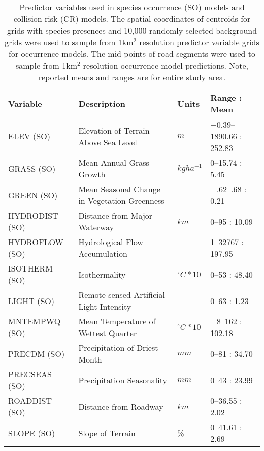 \begin{table}[htp]
\caption[Predictor variables used in species occurrence models and collision risk models]{Predictor variables used in species occurrence (SO) models and collision risk (CR) models. The spatial coordinates of centroids for grids with species presences and 10,000 randomly selected background grids were used to sample from 1km$^2$ resolution predictor variable grids for occurrence models. The mid-points of road segments were used to sample from 1km$^2$ resolution occurrence model predictions. Note, reported means and ranges are for entire study area.}
\centering
\begin{tabularx}{0.9\textwidth}{lYll} \toprule
Variable       &Description                                               &Units          &Range : Mean\\
\midrule 
ELEV (SO)       &Elevation of Terrain Above Sea Level                     &$m$			  &$-$0.39--1890.66 : 252.83\\
GRASS (SO)      &Mean Annual Grass Growth \citep{cart03}	              &$kg ha^{-1}$   &0--15.74 : 5.45\\
GREEN (SO)      &Mean Seasonal Change in Vegetation Greenness             &---            &$-$.62--.68 : 0.21\\
HYDRODIST (SO)  &Distance from Major Waterway                             &$km$           &0--95 : 10.09\\
HYDROFLOW (SO)  &Hydrological Flow Accumulation                           &---            &1--32767 : 197.95\\
ISOTHERM (SO)   &Isothermality                                            &$^{\circ}C*10$ &0--53 : 48.40\\
LIGHT (SO)      &Remote-sensed Artificial Light Intensity                 &---            &0--63 : 1.23\\
MNTEMPWQ (SO)   &Mean Temperature of Wettest Quarter                      &$^{\circ}C*10$ &$-$8--162 : 102.18\\
PRECDM (SO)     &Precipitation of Driest Month                            &$mm$           &0--81 : 34.70\\
PRECSEAS (SO)   &Precipitation Seasonality                                &$mm$           &0--43 : 23.99\\
ROADDIST (SO)   &Distance from Roadway                                    &$km$           &0--36.55 : 2.02\\
SLOPE (SO)      &Slope of Terrain                                         &\%             &0--41.61 : 2.69\\

\end{tabularx}
\end{table}
